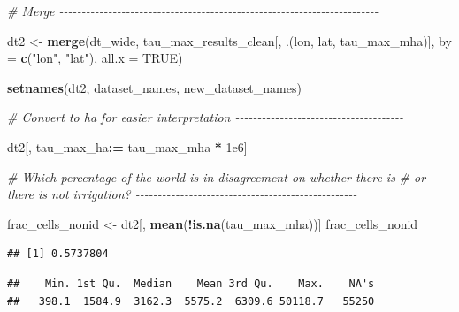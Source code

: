 \documentclass[
  11pt,
]{article}
\newenvironment{Shaded}{\begin{snugshade}}{\end{snugshade}}
\newcommand{\AttributeTok}[1]{\textcolor[rgb]{0.13,0.29,0.53}{#1}}
\newcommand{\CommentTok}[1]{\textcolor[rgb]{0.56,0.35,0.01}{\textit{#1}}}
\newcommand{\ConstantTok}[1]{\textcolor[rgb]{0.56,0.35,0.01}{#1}}
\newcommand{\FloatTok}[1]{\textcolor[rgb]{0.00,0.00,0.81}{#1}}
\newcommand{\FunctionTok}[1]{\textcolor[rgb]{0.13,0.29,0.53}{\textbf{#1}}}
\newcommand{\NormalTok}[1]{#1}
\newcommand{\OtherTok}[1]{\textcolor[rgb]{0.56,0.35,0.01}{#1}}
\newcommand{\SpecialCharTok}[1]{\textcolor[rgb]{0.81,0.36,0.00}{\textbf{#1}}}
\newcommand{\StringTok}[1]{\textcolor[rgb]{0.31,0.60,0.02}{#1}}
\begin{document}
\begin{Shaded}
\begin{Highlighting}[]
\CommentTok{\# Merge {-}{-}{-}{-}{-}{-}{-}{-}{-}{-}{-}{-}{-}{-}{-}{-}{-}{-}{-}{-}{-}{-}{-}{-}{-}{-}{-}{-}{-}{-}{-}{-}{-}{-}{-}{-}{-}{-}{-}{-}{-}{-}{-}{-}{-}{-}{-}{-}{-}{-}{-}{-}{-}{-}{-}{-}{-}{-}{-}{-}{-}{-}{-}{-}{-}{-}{-}{-}{-}{-}{-}{-}}

\NormalTok{dt2 }\OtherTok{\textless{}{-}} \FunctionTok{merge}\NormalTok{(dt\_wide, tau\_max\_results\_clean[, .(lon, lat, tau\_max\_mha)],}
             \AttributeTok{by =} \FunctionTok{c}\NormalTok{(}\StringTok{"lon"}\NormalTok{, }\StringTok{"lat"}\NormalTok{), }\AttributeTok{all.x =} \ConstantTok{TRUE}\NormalTok{)}

\FunctionTok{setnames}\NormalTok{(dt2, dataset\_names, new\_dataset\_names)}

\CommentTok{\# Convert to ha for easier interpretation {-}{-}{-}{-}{-}{-}{-}{-}{-}{-}{-}{-}{-}{-}{-}{-}{-}{-}{-}{-}{-}{-}{-}{-}{-}{-}{-}{-}{-}{-}{-}{-}{-}{-}{-}{-}{-}{-}}

\NormalTok{dt2[, tau\_max\_ha}\SpecialCharTok{:=}\NormalTok{ tau\_max\_mha }\SpecialCharTok{*} \FloatTok{1e6}\NormalTok{]}

\CommentTok{\# Which percentage of the world is in disagreement on whether there is}
\CommentTok{\# or there is not irrigation? {-}{-}{-}{-}{-}{-}{-}{-}{-}{-}{-}{-}{-}{-}{-}{-}{-}{-}{-}{-}{-}{-}{-}{-}{-}{-}{-}{-}{-}{-}{-}{-}{-}{-}{-}{-}{-}{-}{-}{-}{-}{-}{-}{-}{-}{-}{-}{-}{-}{-}}

\NormalTok{frac\_cells\_nonid }\OtherTok{\textless{}{-}}\NormalTok{ dt2[, }\FunctionTok{mean}\NormalTok{(}\SpecialCharTok{!}\FunctionTok{is.na}\NormalTok{(tau\_max\_mha))]}
\NormalTok{frac\_cells\_nonid}
\end{Highlighting}
\end{Shaded}

\begin{verbatim}
## [1] 0.5737804
\end{verbatim}

\begin{Shaded}
\end{Shaded}

\begin{verbatim}
##    Min. 1st Qu.  Median    Mean 3rd Qu.    Max.    NA's 
##   398.1  1584.9  3162.3  5575.2  6309.6 50118.7   55250
\end{verbatim}
\end{document}
